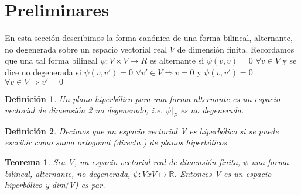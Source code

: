 \documentclass[12pt]{article}
\newtheorem{theorem}{Teorema}
\newtheorem{definition}{Definición}
\begin{document}
 

\section{Preliminares}
En esta sección describimos la forma canónica de una forma bilineal,
alternante, no degenerada sobre un espacio vectorial real $V$ de dimensión finita. 
Recordamos que una tal forma bilineal $\psi :V\times V\rightarrow R$
es alternante si $\psi(v,v)=0$ $\forall v \in V$  y se dice no degenerada si 
$\psi(v,v')=0$ $\forall v' \in V \Rightarrow v = 0$  y 
$\psi(v,v')=0$ $\forall v \in V \Rightarrow v' = 0$

\begin{definition} 
 Un plano hiperbólico para una forma alternante es un espacio vectorial de dimensión 2 no degenerado,
  i.e. $\psi|_P$ es no degenerada. 
\end{definition}

\begin{definition}   
 Decimos que un espacio vectorial V es hiperbólico si se puede escribir como suma ortogonal (directa ) de
 planos hiperbólicos
\end{definition}

\begin{theorem} \label{Lang-8.1}
 Sea V, un espacio vectorial real de dimensión finita, $\psi$ una forma bilineal, alternante, no degenerada, 
 $\psi:VxV\mapsto \mathbb{R}$. Entonces V es un espacio hiperbólico y dim(V) es par.
\end{theorem}
\end{document}
